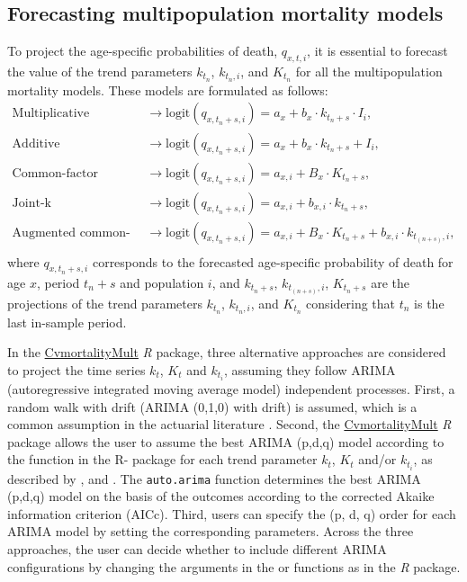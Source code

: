 \subsection{Forecasting multipopulation mortality models}
To project the age-specific probabilities of death, $q_{x,t,i}$, it is essential to forecast the value of the trend parameters $k_{t_{n}}$, $k_{t_{n},i}$, and $K_{t_n}$ for all the multipopulation mortality models. These models are formulated as follows:
\begin{equation}
\begin{split}
\textrm{Multiplicative} & \rightarrow \textrm{logit} \left(q_{x,t_n + s,i} \right) = a_x + b_x \cdot k_{t_n + s} \cdot I_i,\\
\textrm{Additive} & \rightarrow \textrm{logit} \left(q_{x,t_n + s,i} \right) = a_x + b_x \cdot k_{t_n + s} + I_i,\\
\textrm{Common-factor} & \rightarrow \textrm{logit} \left(q_{x,t_n + s,i} \right) = a_{x,i} + B_x \cdot K_{t_n + s},\\
\textrm{Joint-k} & \rightarrow \textrm{logit} \left(q_{x,t_n + s,i} \right) = a_{x,i} + b_{x,i} \cdot k_{t_n + s},\\
\textrm{Augmented common-factor} & \rightarrow \textrm{logit} \left(q_{x,t_n + s,i} \right) = a_{x,i} + B_x \cdot K_{t_n + s} + b_{x,i} \cdot k_{t_{\left({n} + s\right)},i},\\
\end{split}
\end{equation}
where $q_{x,t_n + s,i}$ corresponds to the forecasted age-specific probability of death for age $x$, period $t_{n} + s$ and population $i$, and $k_{t_n + s}$, $k_{t_{\left({n} + s\right)},i}$, $K_{t_n + s}$ are the projections of the trend parameters $k_{t_{n}}$, $k_{t_{n},i}$, and $K_{t_n}$ considering that $t_n$ is the last in-sample period.

In the \href{https://cran.r-project.org/web/packages/CvmortalityMult/index.html}{CvmortalityMult} \emph{R} package, {three} alternative approaches are considered to project the time series $k_t$, $K_{t}$ and $k_{t_i}$, assuming they follow ARIMA (autoregressive integrated moving average model) independent processes. First, a random walk with drift (ARIMA (0,1,0) with drift) is assumed, which is a common assumption in the actuarial literature \citep{Cairns2006, Haberman2011, Villegas2018}. Second, the \href{https://cran.r-project.org/web/packages/CvmortalityMult/index.html}{CvmortalityMult} \emph{R} package allows the user to assume the best ARIMA (p,d,q) model according to the  function in the  R- package \citep{Hyndman2008, Hyndman2023} for each trend parameter $k_t$, $K_{t}$ and/or $k_{t_i}$, as described by \citet{Debon2008}, \citet{Villegas2018} and \citet{Hunt2020}. The \texttt{auto.arima} function determines the best ARIMA (p,d,q) model on the basis of the outcomes according to the corrected Akaike information criterion (AICc). {Third, users can specify the (p, d, q) order for each ARIMA model by setting the corresponding parameters. Across the three} approaches, the user can decide whether to include different ARIMA configurations by changing the arguments in the  or  functions as in the  \emph{R} package.

